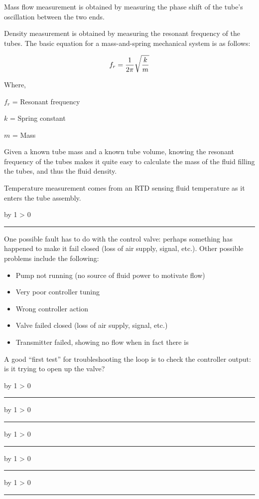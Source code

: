 \documentclass[12pt,a4paper]{article}
\def\svar{
           \advance\answnum by 1
           \ifnum \answnum > 0
                \hrule
                \vskip 3pt
                \leftline{Svar \the\answnum}
                \vskip 3pt \fi}
\begin{document}
\vskip 10pt

Mass flow measurement is obtained by measuring the phase shift of the tube's oscillation between the two ends.  

Density measurement is obtained by measuring the resonant frequency of the tubes.  The basic equation for a mass-and-spring mechanical system is as follows:

$$f_r = {1 \over 2 \pi} \sqrt{k \over m}$$

\noindent
Where,

$f_r$ = Resonant frequency

$k$ = Spring constant

$m$ = Mass 

\vskip 10pt

Given a known tube mass and a known tube volume, knowing the resonant frequency of the tubes makes it quite easy to calculate the mass of the fluid filling the tubes, and thus the fluid density.  

Temperature measurement comes from an RTD sensing fluid temperature as it enters the tube assembly.  

\vskip 10pt \filbreak 
\svar{} 

One possible fault has to do with the control valve: perhaps something has happened to make it fail closed (loss of air supply, signal, etc.).  Other possible problems include the following:

\begin{itemize}
\item{} Pump not running (no source of fluid power to motivate flow)\
\item{} Very poor controller tuning
\item{} Wrong controller action
\item{} Valve failed closed (loss of air supply, signal, etc.)
\item{} Transmitter failed, showing no flow when in fact there is
\end{itemize}

A good ``first test'' for troubleshooting the loop is to check the controller output: is it trying to open up the valve?


\vskip 10pt \filbreak 
\svar{} 


\vskip 10pt \filbreak 
\svar{} 


\vskip 10pt \filbreak 
\svar{} 


\vskip 10pt \filbreak 
\svar{} 


\vskip 10pt \filbreak 
\svar{} 
\end{document}
